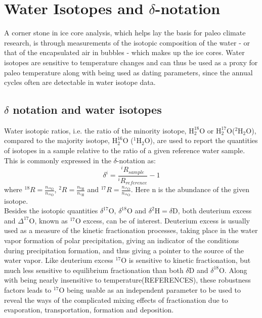 \documentclass[../../CompleteThesis/Complete_1stDraft.tex]{subfiles}
\begin{document}
\section[Water Isotopes][Water Isotopes]{Water Isotopes and $\delta$-notation}
\label{Sec:Ice_WaterIsotopes}
A corner stone in ice core analysis, which helps lay the basis for paleo climate research, is through measurements of the isotopic composition of the water - or that of the encapsulated air in bubbles - which makes up the ice cores. Water isotopes are sensitive to temperature changes and can thus be used as a proxy for paleo temperature along with being used as dating parameters, since the annual cycles often are detectable in water isotope data.
\subsection[$\delta$ notation]{$\delta$ notation and water isotopes}
\label{Subsec:Ice_WaterIsotopes_deltaNotation}

Water isotopic ratios, i.e. the ratio of the minority isotope, ${\text{H}_2^{18}\text{O}}$ or ${\text{H}_2^{17}\text{O}}$($^2\text{H}_2\text{O}$), compared to the majority isotope, ${\text{H}_2^{16}\text{O}}$ ($^1\text{H}_2\text{O}$), are used to report the quantities of isotopes in a sample relative to the ratio of a given reference water sample. This is commonly expressed in the $\delta$-notation as:
\begin{equation}
	\delta^i = \frac{^iR_{sample}}{^iR_{reference}} - 1		
\end{equation}
where $^{18}R = \frac{n_{^{18}\text{O}}}{n_{^{16}\text{O}}}$, $^{2}R = \frac{n_{^{2}\text{H}}}{n_{^{1}\text{H}}}$  and $^{17}R = \frac{n_{^{17}\text{O}}}{n_{^{16}\text{O}}}$. Here n is the abundance of the given isotope.\\
Besides the isotopic quantities $\delta^{17}\text{O}$, $\delta^{18}\text{O}$ and $\delta^2\text{H} = \delta\text{D}$, both deuterium excess and $\Delta^{17}\text{O}$, known as $^{17}\text{O}$ excess, can be of interest. Deuterium excess is usually used as a measure of the kinetic fractionation processes, taking place in the water vapor formation of polar precipitation, giving an indicator of the conditions during precipitation formation, and thus giving a pointer to the source of the water vapor.
Like deuterium excess $^{17}\text{O}$ is sensitive to kinetic fractionation, but much less sensitive to equilibrium fractionation than both $\delta$D and $\delta^{18}$O. Along with being nearly insensitive to temperature(REFERENCES), these robustness factors leads to $^{17}$O being usable as an independent parameter to be used to reveal the ways of the complicated mixing effects of fractionation due to evaporation, transportation, formation and deposition.
\end{document}
